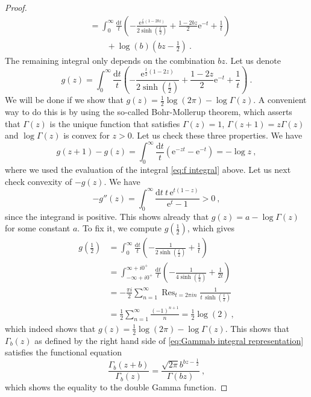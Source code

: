\documentclass[12pt,a4paper]{article}
\newcommand{\be}{\begin{equation}}
\newcommand{\ee}{\end{equation}}
\DeclareMathOperator*{\Res}{Res}
\begin{document}
\begin{enumerate}
\begin{proof}
\begin{align}
        &=\int_0^\infty \frac{\mathrm{d}t}{t} \left(-\frac{\mathrm{e}^{\frac{t}{2}(1-2bz)}}{2 \sinh(\frac{t}{2})}+\frac{1-2b z}{2} \mathrm{e}^{-t}+\frac{1}{t}\right) \nonumber\\
        &\qquad+\log(b)\left(bz-\frac{1}{2}\right)\ .
    \end{align}
    The remaining integral only depends on the combination $bz$. Let us denote
    \be  
        g(z)=\int_0^\infty \frac{\mathrm{d}t}{t} \left(-\frac{\mathrm{e}^{\frac{t}{2}(1-2z)}}{2 \sinh(\frac{t}{2})}+\frac{1-2z}{2} \mathrm{e}^{-t}+\frac{1}{t}\right)\ . \label{eq:g integral}
    \ee
    We will be done if we show that $g(z)=\frac{1}{2}\log(2\pi)-\log \Gamma(z)$. A convenient way to do this is by using the so-called Bohr-Mollerup theorem, which asserts that $\Gamma(z)$ is the unique function that satisfies $\Gamma(z)=1$, $\Gamma(z+1)=z\Gamma(z)$ and $\log \Gamma(z)$ is convex for $z>0$. Let us check these three properties. We have
    \be  
        g(z+1)-g(z)=\int_0^\infty \frac{\mathrm{d}t}{t} \left(\mathrm{e}^{-z t}-\mathrm{e}^{-t}\right)=-\log z\ ,
    \ee
    where we used the evaluation of the integral \eqref{eq:f integral} above. Let us next check convexity of $-g(z)$. We have
    \be  
        -g''(z)=\int_0^\infty \frac{\mathrm{d}t\ t \,\mathrm{e}^{t(1-z)}}{\mathrm{e}^t-1}>0\ ,
    \ee
    since the integrand is positive. This shows already that $g(z)=a-\log\Gamma(z)$ for some constant $a$. To fix it, we compute $g(\frac{1}{2})$, which gives
    \begin{align}
        g(\tfrac{1}{2})&=\int_0^\infty \frac{\mathrm{d}t}{t} \left(-\frac{1}{2 \sinh(\frac{t}{2})}+\frac{1}{t}\right) \\
        &=\int_{-\infty+i 0^+}^{\infty+i 0^+} \frac{\mathrm{d}t}{t} \left(-\frac{1}{4 \sinh(\frac{t}{2})}+\frac{1}{2t}\right) \\
        &=-\frac{\pi i}{2} \sum_{n=1}^\infty \Res_{t=2\pi i n} \frac{1}{t\, \sinh(\frac{t}{2})} \\
        &=\frac{1}{2} \sum_{n=1}^\infty \frac{(-1)^{n+1}}{n}=\frac{1}{2}\log(2)\ ,
    \end{align}
    which indeed shows that $g(z)=\frac{1}{2}\log(2\pi)-\log\Gamma(z)$. This shows that $\Gamma_b(z)$ as defined by the right hand side of \eqref{eq:Gammab integral representation} satisfies the functional equation
    \be  
        \frac{\Gamma_b(z+b)}{\Gamma_b(z)}=\frac{\sqrt{2\pi} b^{bz-\frac{1}{2}}}{\Gamma(bz)}\ ,
    \ee
    which shows the equality to the double Gamma function.
    \end{proof}

\end{enumerate}
\end{document}
